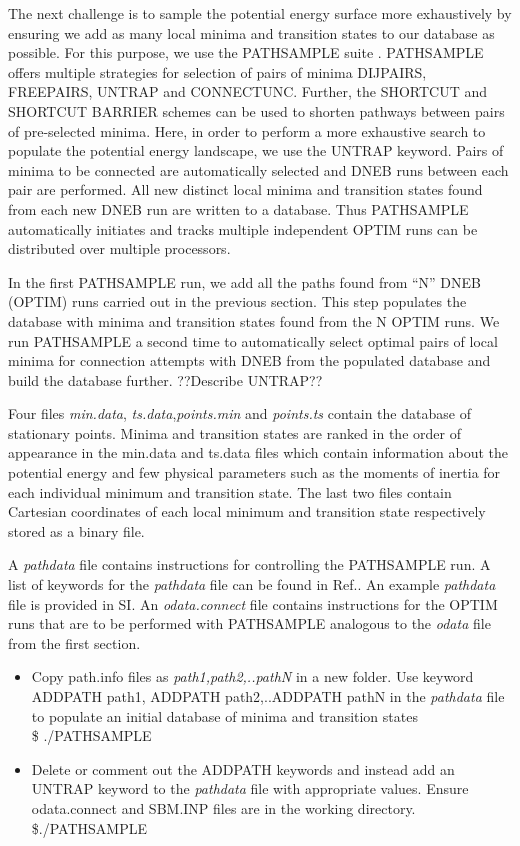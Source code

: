 \documentclass[journal=jacsat]{achemso}
\begin{document}
The next challenge is to sample the potential energy surface more exhaustively by ensuring we add as many local minima and transition states to our database  as possible. For this purpose, we use the PATHSAMPLE suite \cite{PATHSAMPLE}. PATHSAMPLE offers multiple strategies for selection of pairs of minima  DIJPAIRS\cite{Strodel07a}, FREEPAIRS\cite{Carr08a}, UNTRAP\cite{Strodel07a} and CONNECTUNC\cite{Roder18a}. Further, the SHORTCUT\cite{Carr05a,Strodel07a} and SHORTCUT BARRIER\cite{Strodel07a} schemes can be used to shorten pathways between pairs of pre-selected minima. Here, in order to perform a more exhaustive search to populate the potential energy landscape, we use the UNTRAP\cite{Strodel07a} keyword. Pairs of minima to be connected are automatically selected and DNEB runs between each pair are performed. All new distinct local minima and transition states found from each new DNEB run are written to a database. Thus PATHSAMPLE automatically initiates and tracks multiple independent OPTIM runs can be distributed over multiple processors. 

In the first PATHSAMPLE run, we add all the paths found from ``N'' DNEB (OPTIM) runs carried out in the previous section. This step populates the database with minima and transition states found from the N OPTIM runs. We run PATHSAMPLE a second time to automatically select optimal pairs of local minima for connection attempts with DNEB from the populated database and build the database further. ??Describe UNTRAP??

Four files \emph{min.data}, \emph{ts.data},\emph{points.min} and \emph{points.ts} contain the database of stationary points. Minima and transition states are ranked in the order of appearance in the min.data and ts.data files which contain information about the potential energy and few physical parameters such as the moments of inertia for each individual minimum and transition state. The last two files contain Cartesian coordinates of each local minimum and transition state respectively stored as a binary file. 

A \emph{pathdata} file contains instructions for controlling the PATHSAMPLE run. A list of keywords for the \emph{pathdata} file can be found in Ref.\cite{PATHSAMPLE}. An example \emph{pathdata} file is provided in SI. An \emph{odata.connect} file contains instructions for the OPTIM runs that are to be performed with PATHSAMPLE analogous to the \emph{odata} file from the first section.

\begin{itemize}
    \item {Copy path.info files as \emph{path1,path2,..pathN} in a new folder. Use keyword ADDPATH path1, ADDPATH path2,..ADDPATH pathN in the \emph{pathdata} file to populate an initial database of minima and transition states\\ \$ ./PATHSAMPLE}
    \item {Delete or comment out the ADDPATH keywords and instead add an UNTRAP keyword to the \emph{pathdata} file with appropriate values. Ensure odata.connect and SBM.INP files are in the working directory. \\ \$./PATHSAMPLE}
\end{itemize}
\end{document}
